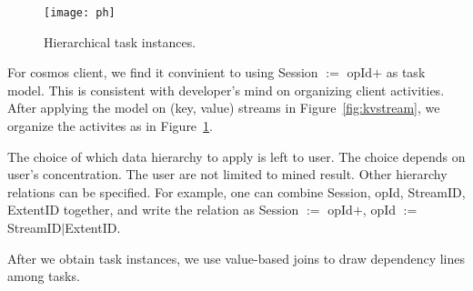 \begin{figure}
\centering
\texttt{[image: ph]}
\caption{Hierarchical task instances.}
\label{fig:runtime}
\end{figure}

For cosmos client, we find it convinient to using Session
$:=$ opId$+$ as task model. This is consistent with
developer's mind on organizing client activities. After
applying the model on (key, value) streams in
Figure~\ref{fig:kvstream}, we organize the activites as in
Figure~\ref{fig:runtime}.

The choice of which data hierarchy to apply is left to user.
The choice depends on user's concentration. The user are not
limited to mined result. Other hierarchy relations can be
specified. For example, one can combine Session, opId,
StreamID, ExtentID together, and write the relation as
Session $:=$ opId$+$, opId $:=$ StreamID$|$ExtentID.

After we obtain task instances, we use value-based joins to
draw dependency lines among tasks.

